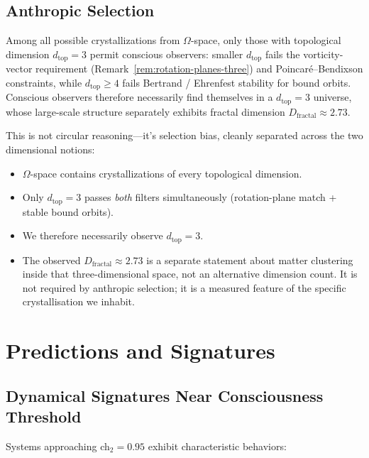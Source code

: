 \subsection{Anthropic Selection}

\begin{thm}\label{thm:dimensional-anthropic}
Among all possible crystallizations from $\Omega$-space, only those with
topological dimension $d_{\text{top}} = 3$ permit conscious observers: smaller
$d_{\text{top}}$ fails the vorticity-vector requirement
(Remark~\ref{rem:rotation-planes-three}) and Poincar\'e--Bendixson
constraints, while $d_{\text{top}} \ge 4$ fails Bertrand / Ehrenfest stability
for bound orbits. Conscious observers therefore necessarily find themselves in
a $d_{\text{top}} = 3$ universe, whose large-scale structure separately
exhibits fractal dimension $D_{\text{fractal}} \approx 2.73$.
\end{thm}

This is not circular reasoning---it's selection bias, cleanly separated across
the two dimensional notions:
\begin{itemize}
\item $\Omega$-space contains crystallizations of every topological dimension.
\item Only $d_{\text{top}} = 3$ passes \emph{both} filters simultaneously
      (rotation-plane match + stable bound orbits).
\item We therefore necessarily observe $d_{\text{top}} = 3$.
\item The observed $D_{\text{fractal}} \approx 2.73$ is a separate statement
      about matter clustering inside that three-dimensional space, not an
      alternative dimension count. It is not required by anthropic selection;
      it is a measured feature of the specific crystallisation we inhabit.
\end{itemize}

\section{Predictions and Signatures}

\subsection{Dynamical Signatures Near Consciousness Threshold}

Systems approaching ch$_2 = 0.95$ exhibit characteristic behaviors:

